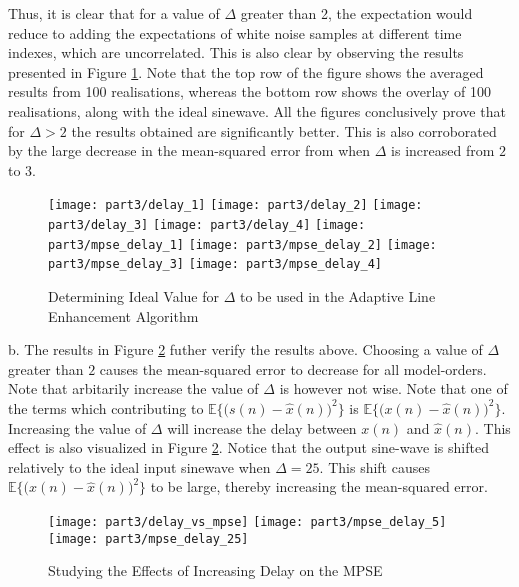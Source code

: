 \noindent{}Thus, it is clear that for a value of $\Delta$ greater than 2, the expectation would reduce to adding the expectations of white noise samples at different time indexes, which are uncorrelated. This is also clear by observing the results presented in Figure \ref{fig:ale}. Note that the top row of the figure shows the averaged results from 100 realisations, whereas the bottom row shows the overlay of 100 realisations, along with the ideal sinewave. All the figures conclusively prove that for $\Delta>2$ the results obtained are significantly better. This is also corroborated by the large decrease in the mean-squared error from when $\Delta$ is increased from $2$ to $3$.

\begin{figure}[H]
\centering{}
\texttt{[image: part3/delay\_1]}
\texttt{[image: part3/delay\_2]}
\texttt{[image: part3/delay\_3]}
\texttt{[image: part3/delay\_4]}
\texttt{[image: part3/mpse\_delay\_1]}
\texttt{[image: part3/mpse\_delay\_2]}
\texttt{[image: part3/mpse\_delay\_3]}
\texttt{[image: part3/mpse\_delay\_4]}
\caption{Determining Ideal Value for $\Delta$ to be used in the Adaptive Line Enhancement Algorithm}
\label{fig:ale}
\end{figure}


\noindent{}b. The results in Figure \ref{fig:ale_delay} futher verify the results above. Choosing a value of $\Delta$ greater than $2$ causes the mean-squared error to decrease for all model-orders. Note that arbitarily increase the value of $\Delta$ is however not wise. Note that one of the terms which contributing to $\mathbb{E}\bigg\{\bigg(s(n)-\hat{x}(n)\bigg)^2\bigg\}$ is $\mathbb{E}\bigg\{\bigg(x(n)-\hat{x}(n)\bigg)^2\bigg\}$. Increasing the value of $\Delta$ will increase the delay between $x(n)$ and $\hat{x}(n)$. This effect is also visualized in Figure \ref{fig:ale_delay}. Notice that the output sine-wave is shifted relatively to the ideal input sinewave when $\Delta=25$. This shift causes $\mathbb{E}\bigg\{\bigg(x(n)-\hat{x}(n)\bigg)^2\bigg\}$ to be large, thereby increasing the mean-squared error.


\begin{figure}[H]
\centering{}
\texttt{[image: part3/delay\_vs\_mpse]}
\texttt{[image: part3/mpse\_delay\_5]}
\texttt{[image: part3/mpse\_delay\_25]}
\caption{Studying the Effects of Increasing Delay on the MPSE}
\label{fig:ale_delay}
\end{figure}


